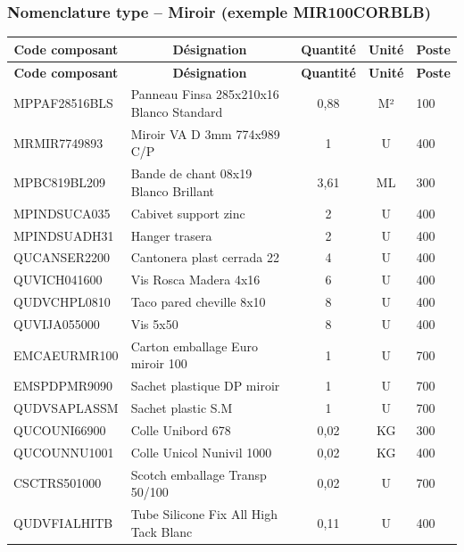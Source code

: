 \documentclass[12pt,a4paper]{article}
\begin{document}
\subsubsection{Nomenclature type – Miroir (exemple MIR100CORBLB)}

\begin{longtable}{|p{3.5cm}|p{6cm}|c|c|p{2.5cm}|}
\hline
\multicolumn{1}{|c|}{\textbf{Code composant}} & \multicolumn{1}{c|}{\textbf{Désignation}} & \multicolumn{1}{c|}{\textbf{Quantité}} & \multicolumn{1}{c|}{\textbf{Unité}} & \multicolumn{1}{c|}{\textbf{Poste}} \\
\hline
\endfirsthead
\hline
\multicolumn{1}{|c|}{\textbf{Code composant}} & \multicolumn{1}{c|}{\textbf{Désignation}} & \multicolumn{1}{c|}{\textbf{Quantité}} & \multicolumn{1}{c|}{\textbf{Unité}} & \multicolumn{1}{c|}{\textbf{Poste}} \\
\hline
\endhead
\hline
\endfoot
MPPAF28516BLS & Panneau Finsa 285x210x16 Blanco Standard & 0,88 & M² & 100 \\
MRMIR7749893 & Miroir VA D 3mm 774x989 C/P & 1 & U & 400 \\
MPBC819BL209 & Bande de chant 08x19 Blanco Brillant & 3,61 & ML & 300 \\
MPINDSUCA035 & Cabivet support zinc & 2 & U & 400 \\
MPINDSUADH31 & Hanger trasera & 2 & U & 400 \\
QUCANSER2200 & Cantonera plast cerrada 22 & 4 & U & 400 \\
QUVICH041600 & Vis Rosca Madera 4x16 & 6 & U & 400 \\
QUDVCHPL0810 & Taco pared cheville 8x10 & 8 & U & 400 \\
QUVIJA055000 & Vis 5x50 & 8 & U & 400 \\
EMCAEURMR100 & Carton emballage Euro miroir 100 & 1 & U & 700 \\
EMSPDPMR9090 & Sachet plastique DP miroir & 1 & U & 700 \\
QUDVSAPLASSM & Sachet plastic S.M & 1 & U & 700 \\
QUCOUNI66900 & Colle Unibord 678 & 0,02 & KG & 300 \\
QUCOUNNU1001 & Colle Unicol Nunivil 1000 & 0,02 & KG & 400 \\
CSCTRS501000 & Scotch emballage Transp 50/100 & 0,02 & U & 700 \\
QUDVFIALHITB & Tube Silicone Fix All High Tack Blanc & 0,11 & U & 400 \\
\hline
\end{longtable}
\end{document}
